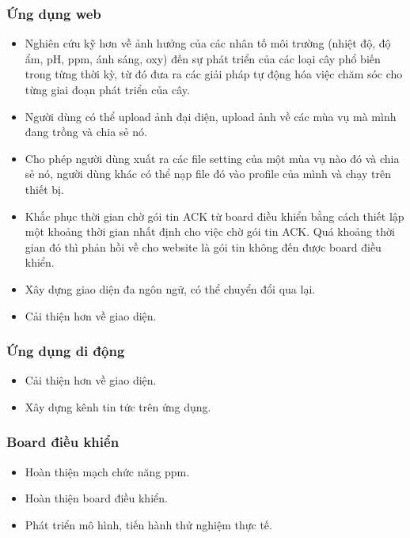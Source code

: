 \documentclass[a4paper,12pt,oneside]{article}
\begin{document}
\subsubsection{Ứng dụng web}
\begin{itemize}
\item Nghiên cứu kỹ hơn về ảnh hưởng của các nhân tố môi trường (nhiệt độ, độ ẩm, pH, ppm, ánh sáng, oxy) đến sự phát triển của các loại cây phổ biến trong từng thời kỳ, từ đó đưa ra các giải pháp tự động hóa việc chăm sóc cho từng giai đoạn phát triển của cây.
\item Người dùng có thể upload ảnh đại diện, upload ảnh về các mùa vụ mà mình đang trồng và chia sẻ nó.
\item Cho phép người dùng xuất ra các file setting của một mùa vụ nào đó và chia sẻ nó, người dùng khác có thể nạp file đó vào profile của mình và chạy trên thiết bị.
\item Khắc phục thời gian chờ gói tin ACK từ board điều khiển bằng cách thiết lập một khoảng thời gian nhất định cho việc chờ gói tin ACK. Quá khoảng thời gian đó thì phản hồi về cho website là gói tin không đến được board điều khiển.
\item Xây dựng giao diện đa ngôn ngữ, có thể chuyển đổi qua lại.
\item Cải thiện hơn về giao diện.
\end{itemize}

\subsubsection{Ứng dụng di động}
\begin{itemize}
\item Cải thiện hơn về giao diện.
\item Xây dựng kênh tin tức trên ứng dụng.
\end{itemize}

\subsubsection{Board điều khiển}
\begin{itemize}
\item Hoàn thiện mạch chức năng ppm.
\item Hoàn thiện board điều khiển.
\item Phát triển mô hình, tiến hành thử nghiệm thực tế.
\end{itemize}
\end{document}
